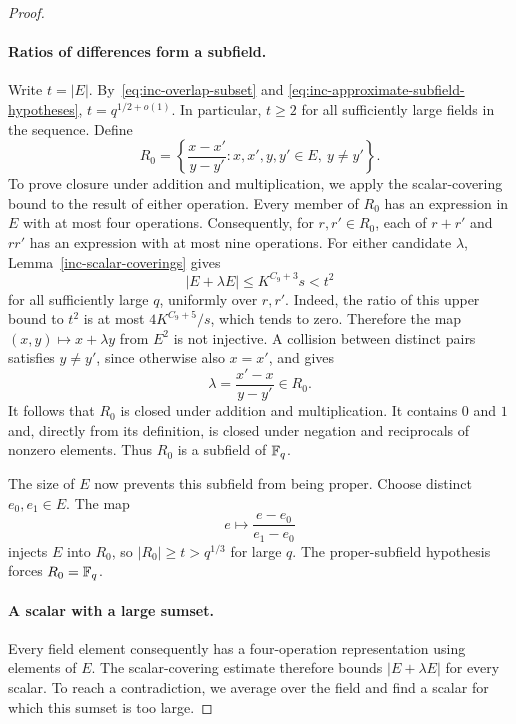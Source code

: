 \begin{proof}
\paragraph{Ratios of differences form a subfield.}
Write $t=|E|$. By~\eqref{eq:inc-overlap-subset} and
\eqref{eq:inc-approximate-subfield-hypotheses},
$t=q^{1/2+o(1)}$. In particular, $t\ge2$ for all sufficiently
large fields in the sequence. Define
\begin{equation}\label{eq:inc-ratio-set}
 R_0=\left\{\frac{x-x'}{y-y'}:
 x,x',y,y'\in E,\ y\ne y'\right\}.
\end{equation}
To prove closure under addition and multiplication, we apply the
scalar-covering bound to the result of either operation.
Every member of $R_0$ has an expression in $E$ with at most four
operations. Consequently, for $r,r'\in R_0$, each of $r+r'$ and
$rr'$ has an expression with at most nine operations. For either
candidate $\lambda$, Lemma~\ref{inc-scalar-coverings} gives
\[
 |E+\lambda E|\le K^{C_9+3}s<t^2
\]
for all sufficiently large $q$, uniformly over $r,r'$.
Indeed, the ratio of this upper bound to $t^2$ is at most
$4K^{C_9+5}/s$, which tends to zero. Therefore the map
$(x,y)\mapsto x+\lambda y$ from $E^2$ is not injective. A collision
between distinct pairs satisfies $y\ne y'$, since otherwise also
$x=x'$, and gives
\[
 \lambda=\frac{x'-x}{y-y'}\in R_0.
\]
It follows that $R_0$ is closed under addition and multiplication.
It contains $0$ and $1$ and, directly from its definition, is closed
under negation and reciprocals of nonzero elements. Thus $R_0$ is a
subfield of $\mathbb F_q$.

The size of $E$ now prevents this subfield from being proper.
Choose distinct $e_0,e_1\in E$. The map
\[
 e\longmapsto\frac{e-e_0}{e_1-e_0}
\]
injects $E$ into $R_0$, so $|R_0|\ge t>q^{1/3}$ for large $q$.
The proper-subfield hypothesis forces $R_0=\mathbb F_q$.

\paragraph{A scalar with a large sumset.}
Every field element consequently has a four-operation representation
using elements of $E$. The scalar-covering estimate therefore bounds
$|E+\lambda E|$ for every scalar. To reach a contradiction, we average
over the field and find a scalar for which this sumset is too large.


\end{proof}
